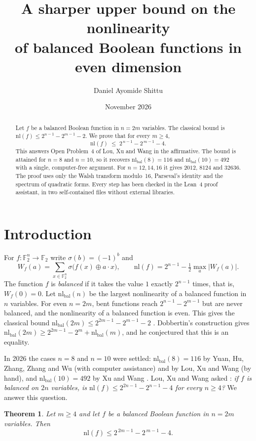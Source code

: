 \documentclass[11pt]{amsart}
\title[Balanced functions in even dimension]{A sharper upper bound on the nonlinearity\\ of balanced Boolean functions in even dimension}
\author{Daniel Ayomide Shittu}
\date{November 2026}
\newtheorem{theorem}{Theorem}
\theoremstyle{remark}
\newcommand{\F}{\mathbb{F}_2}
\newcommand{\W}{W}
\newcommand{\nl}{\mathrm{nl}}
\newcommand{\sg}{\sigma}
\begin{document}
\begin{abstract}
Let $f$ be a balanced Boolean function in $n=2m$ variables. The classical bound
is $\nl(f)\le 2^{n-1}-2^{m-1}-2$. We prove that for every $m\ge 4$,
\[
  \nl(f)\;\le\;2^{\,n-1}-2^{\,m-1}-4 .
\]
This answers Open Problem~4 of Lou, Xu and Wang in the affirmative. The bound is
attained for $n=8$ and $n=10$, so it recovers $\nl_{\mathrm{bal}}(8)=116$ and
$\nl_{\mathrm{bal}}(10)=492$ with a single, computer-free argument. For $n=12,14,16$ it
gives $2012$, $8124$ and $32636$. The proof uses only the Walsh transform modulo~16,
Parseval's identity and the spectrum of quadratic forms. Every step has been checked
in the Lean~4 proof assistant, in two self-contained files without external
libraries.
\end{abstract}

\maketitle

\section{Introduction}

For $f:\F^n\to\F$ write $\sg(b)=(-1)^b$ and
\[
  \W_f(a)=\sum_{x\in\F^n}\sg\bigl(f(x)\oplus a\cdot x\bigr),\qquad
  \nl(f)=2^{n-1}-\tfrac12\max_a|\W_f(a)| .
\]
The function $f$ is \emph{balanced} if it takes the value $1$ exactly $2^{n-1}$ times,
that is, $\W_f(0)=0$. Let $\nl_{\mathrm{bal}}(n)$ be the largest nonlinearity of a balanced
function in $n$ variables. For even $n=2m$, bent functions reach $2^{n-1}-2^{m-1}$ but are
never balanced, and the nonlinearity of a balanced function is even. This gives the
classical bound $\nl_{\mathrm{bal}}(2m)\le 2^{2m-1}-2^{m-1}-2$ \cite{SZZ93,Carlet21}.
Dobbertin's construction \cite{Dob94} gives
$\nl_{\mathrm{bal}}(2m)\ge 2^{2m-1}-2^m+\nl_{\mathrm{bal}}(m)$, and he conjectured that this is
an equality.

In 2026 the cases $n=8$ and $n=10$ were settled: $\nl_{\mathrm{bal}}(8)=116$ by Yuan, Hu, Zhang, Zhang and Wu \cite{YHZZW26}
(with computer assistance) and by Lou, Xu and Wang \cite{LXW26} (by hand), and
$\nl_{\mathrm{bal}}(10)=492$ by Xu and Wang \cite{XW26}. Lou, Xu and Wang asked
\cite[Open Problem~4]{LXW26}: \emph{if $f$ is balanced on $2n$ variables, is
$\nl(f)\le 2^{2n-1}-2^{n-1}-4$ for every $n\ge 4$?} We answer this question.

\begin{theorem}\label{thm:main}
Let $m\ge 4$ and let $f$ be a balanced Boolean function in $n=2m$ variables. Then
\[
  \nl(f)\le 2^{\,2m-1}-2^{\,m-1}-4 .
\]
\end{theorem}
\end{document}
